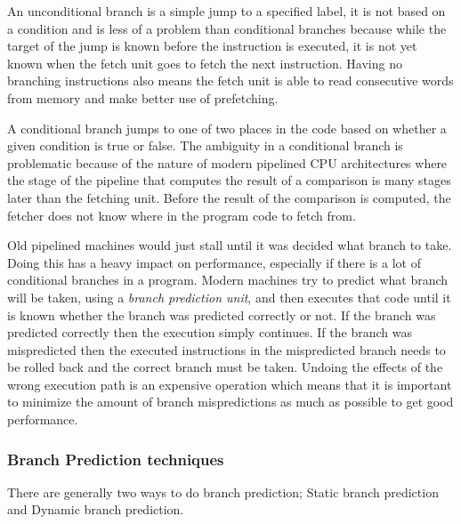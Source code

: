 An unconditional branch is a simple jump to a specified label, it is not based on a condition and is less of a problem than conditional branches because while the target of the jump is known before the instruction is executed, it is not yet known when the fetch unit goes to fetch the next instruction.
Having no branching instructions also means the fetch unit is able to read consecutive words from memory and make better use of prefetching.

A conditional branch jumps to one of two places in the code based on whether a given condition is true or false.
The ambiguity in a conditional branch is problematic because of the nature of modern pipelined CPU architectures where the stage of the pipeline that computes the result of a comparison is many stages later than the fetching unit.
Before the result of the comparison is computed, the fetcher does not know where in the program code to fetch from.

Old pipelined machines would just stall until it was decided what branch to take. 
Doing this has a heavy impact on performance, especially if there is a lot of conditional branches in a program.
Modern machines try to predict what branch will be taken, using a \emph{branch prediction unit}, and then executes that code until it is known whether the branch was predicted correctly or not. 
If the branch was predicted correctly then the execution simply continues.
If the branch was mispredicted then the executed instructions in the mispredicted branch needs to be rolled back and the correct branch must be taken. 
Undoing the effects of the wrong execution path is an expensive operation which means that it is important to minimize the amount of branch mispredictions as much as possible to get good performance.

\subsubsection{Branch Prediction techniques}
There are generally two ways to do branch prediction; Static branch prediction and Dynamic branch prediction.


